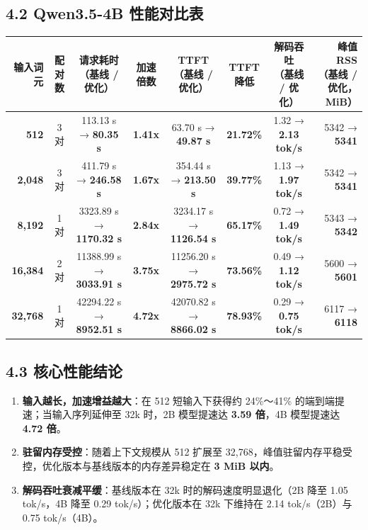 \documentclass[10pt,a4paper,fontset=none]{ctexart}
\begin{document}
\subsection{4.2 Qwen3.5-4B 性能对比表}

\begin{scriptsize}
\setlength{\tabcolsep}{2.5pt}
\begin{tabular*}{\textwidth}{@{\extracolsep{\fill}}rccccccr@{}}
\toprule
\textbf{输入词元} & \textbf{配对数} & \shortstack{\textbf{请求耗时}\\（基线 / 优化）} & \textbf{加速倍数} & \shortstack{\textbf{TTFT}\\（基线 / 优化）} & \shortstack{\textbf{TTFT}\\降低} & \shortstack{\textbf{解码吞吐}\\（基线 / 优化）} & \shortstack{\textbf{峰值 RSS}\\（基线 / 优化，MiB）} \\
\midrule
\textbf{512} & 3 对 & 113.13 s → \textbf{80.35 s} & \textbf{1.41x} & 63.70 s → \textbf{49.87 s} & \textbf{21.72\%} & 1.32 → \textbf{2.13 tok/s} & 5342 → \textbf{5341} \\
\textbf{2,048} & 3 对 & 411.79 s → \textbf{246.58 s} & \textbf{1.67x} & 354.44 s → \textbf{213.50 s} & \textbf{39.77\%} & 1.13 → \textbf{1.97 tok/s} & 5342 → \textbf{5341} \\
\textbf{8,192} & 1 对 & 3323.89 s → \textbf{1170.32 s} & \textbf{2.84x} & 3234.17 s → \textbf{1126.54 s} & \textbf{65.17\%} & 0.72 → \textbf{1.49 tok/s} & 5343 → \textbf{5342} \\
\textbf{16,384} & 2 对 & 11388.99 s → \textbf{3033.91 s} & \textbf{3.75x} & 11256.20 s → \textbf{2975.72 s} & \textbf{73.56\%} & 0.49 → \textbf{1.12 tok/s} & 5600 → \textbf{5601} \\
\textbf{32,768} & 1 对 & 42294.22 s → \textbf{8952.51 s} & \textbf{4.72x} & 42070.82 s → \textbf{8866.02 s} & \textbf{78.93\%} & 0.29 → \textbf{0.75 tok/s} & 6117 → \textbf{6118} \\
\bottomrule
\end{tabular*}
\end{scriptsize}

\subsection{4.3 核心性能结论}
\begin{enumerate}
  \item \textbf{输入越长，加速增益越大}：在 512 短输入下获得约 24\%～41\% 的端到端提速；当输入序列延伸至 32k 时，2B 模型提速达 \textbf{3.59 倍}，4B 模型提速达 \textbf{4.72 倍}。
  \item \textbf{驻留内存受控}：随着上下文规模从 512 扩展至 32,768，峰值驻留内存平稳受控，优化版本与基线版本的内存差异稳定在 \textbf{3 MiB 以内}。
  \item \textbf{解码吞吐衰减平缓}：基线版本在 32k 时的解码速度明显退化（2B 降至 1.05 tok/s，4B 降至 0.29 tok/s）；优化版本在 32k 下维持在 2.14 tok/s（2B）与 0.75 tok/s（4B）。
\end{enumerate}
\end{document}
